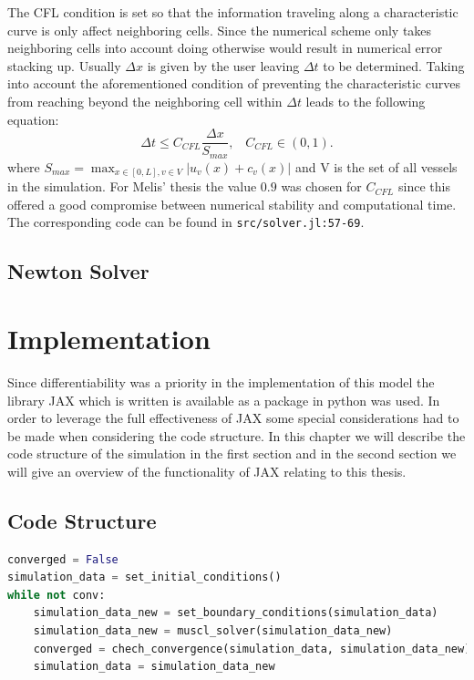 \documentclass[a4paper, oneside]{discothesis}
\begin{document}
The CFL condition is set so that the information traveling along a characteristic curve is only affect neighboring cells. 
Since the numerical scheme only takes neighboring cells into account doing otherwise would result in numerical error stacking up.
Usually $\Delta x$ is given by the user leaving $\Delta t$ to be determined.
Taking into account the aforementioned condition of preventing the characteristic curves from reaching beyond the neighboring cell within $\Delta t$ leads to the following equation:
\begin{equation}
	\Delta t \leq C_{CFL} \frac{\Delta x}{S_{max}},\hspace{10pt}  C_{CFL} \in (0,1).
\end{equation}
where $S_{max} = \max_{x \in [0,L], v \in V} | u_v(x) + c_v(x) |$ and V is the set of all vessels in the simulation.  
For Melis' thesis the value $0.9$ was chosen for $C_{CFL}$ since this offered a good compromise between numerical stability and computational time.
The corresponding code can be found in \texttt{src/solver.jl:57-69}.

\section{Newton Solver}

\chapter{Implementation}
Since differentiability was a priority in the implementation of this model the library JAX which is written is available as a package in python was used.
In order to leverage the full effectiveness of JAX some special considerations had to be made when considering the code structure.
In this chapter we will describe the code structure of the simulation in the first section and in the second section we will give an overview of the functionality of JAX relating to this thesis.

\section{Code Structure}
\begin{lstlisting}[language=Python, caption=code structure in pseudocode]
converged = False
simulation_data = set_initial_conditions()
while not conv:
	simulation_data_new = set_boundary_conditions(simulation_data)
	simulation_data_new = muscl_solver(simulation_data_new)
	converged = chech_convergence(simulation_data, simulation_data_new)
	simulation_data = simulation_data_new
\end{lstlisting}
\end{document}

